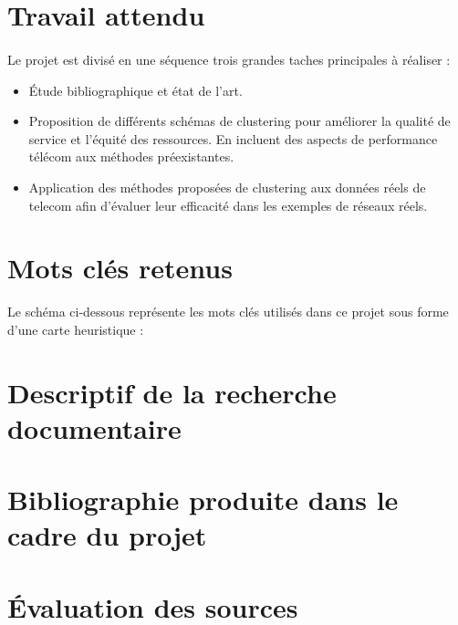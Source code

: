 \documentclass{article}
\begin{document}
\section{Travail attendu}
\paragraph{}
 Le projet est divisé en une séquence trois grandes taches principales à réaliser : \\
\begin{itemize}
    \item Étude bibliographique et état de l'art. 
    \item Proposition de différents schémas de clustering pour améliorer la qualité de service et l'équité des ressources. En incluent des aspects de performance télécom aux méthodes préexistantes.
    \item Application des méthodes proposées de clustering aux données réels de telecom afin d'évaluer leur efficacité dans les exemples de réseaux réels.
\end{itemize}

\section{Mots clés retenus}
Le schéma ci-dessous représente les mots clés utilisés dans ce projet sous forme d'une carte heuristique :\\

\section{Descriptif de la recherche documentaire}
\section{Bibliographie produite dans le cadre du projet}
\section{Évaluation des sources}
\end{document}
